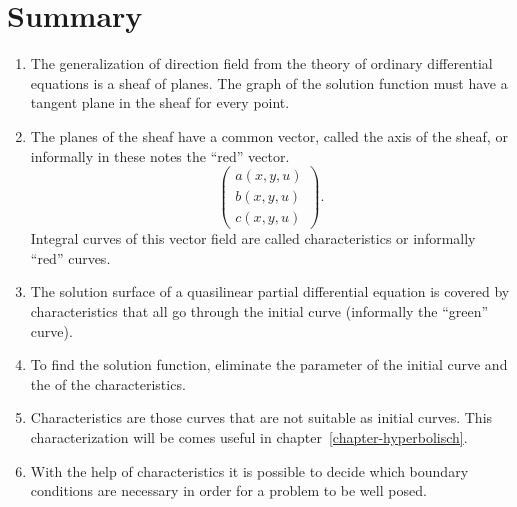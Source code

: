 \section{Summary}
\begin{enumerate}
\item
The generalization of direction field from the theory of ordinary
differential equations is a sheaf of planes.
The graph of the solution function must have a tangent plane in the 
sheaf for every point.
\item
The planes of the sheaf have a common vector, called the axis of the sheaf,
or informally in these notes the ``red'' vector.
\[
\begin{pmatrix}
a(x,y,u)\\
b(x,y,u)\\
c(x,y,u)
\end{pmatrix}.
\]
Integral curves of this vector field are called characteristics
or informally ``red'' curves.
\item
The solution surface of a quasilinear partial differential equation
is covered by characteristics that all go through the initial curve
(informally the ``green'' curve).
\item
To find the solution function, eliminate the parameter of the initial
curve and the of the characteristics.
\item
Characteristics are those curves that are not suitable as initial
curves.
This characterization will be comes useful in
chapter~\ref{chapter-hyperbolisch}.
\item
With the help of characteristics it is possible to decide which boundary
conditions are necessary in order for a problem to be well posed.
\end{enumerate}
